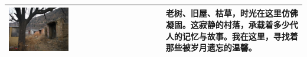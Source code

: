 \begin{longtable}{
  |>{\centering\arraybackslash}m{} %
  |>{\centering\arraybackslash}m{}|   %
}
\hline
\includegraphics[width=0.4\textwidth]{figures/图文测试/6.jpg} & 老树、旧屋、枯草，时光在这里仿佛凝固。这寂静的村落，承载着多少代人的记忆与故事。我在这里，寻找着那些被岁月遗忘的温馨。 \\
\hline

\end{longtable}


  

